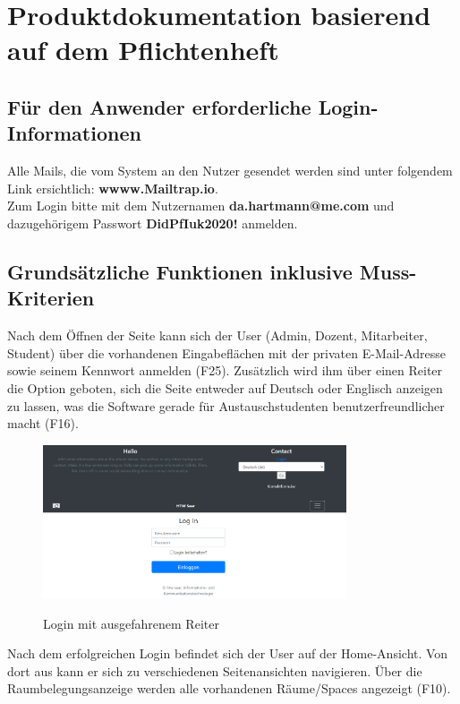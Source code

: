 \documentclass[a4paper,report,headsepline]{scrreprt}
\begin{document}
\chapter{Produktdokumentation basierend auf dem Pflichtenheft}\label{cha:Produktdokumentation}
\section{Für den Anwender erforderliche Login-Informationen}
Alle Mails, die vom System an den Nutzer gesendet werden sind unter folgendem Link ersichtlich: \textbf{wwww.Mailtrap.io}. \\
Zum Login bitte mit dem Nutzernamen \dq \textbf{da.hartmann@me.com}\dq{} 
und dazugehörigem Passwort \dq  \textbf{DidPfIuk2020!}\dq{} anmelden.
\section{Grundsätzliche Funktionen inklusive Muss-Kriterien}
Nach dem Öffnen der Seite kann sich der User (Admin, Dozent, Mitarbeiter, Student) über die vorhandenen Eingabeflächen mit der privaten E-Mail-Adresse sowie seinem Kennwort anmelden (F25). Zusätzlich wird ihm über einen Reiter die Option geboten, sich die Seite entweder auf Deutsch oder Englisch anzeigen zu lassen, was die Software gerade für Austauschstudenten benutzerfreundlicher macht (F16). 
\begin{figure}[h]
    \centering
    \caption{Login mit ausgefahrenem Reiter}
    \includegraphics[width=0.8\textwidth]{Login mit ausgefahrenem Reiter}
    \label{fig:Login mit ausgefahrenem Reiter}
\end{figure}
Nach dem erfolgreichen Login befindet sich der User auf der Home-Ansicht. Von dort aus kann er sich zu verschiedenen Seitenansichten navigieren. Über die Raumbelegungsanzeige werden alle vorhandenen Räume/Spaces angezeigt (F10).
\end{document}

